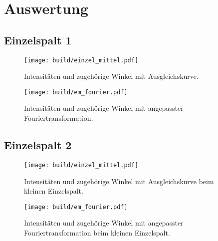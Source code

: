 \section{Auswertung}
\label{sec:Auswertung}
\subsection{Einzelspalt 1}
    \begin{figure}
        \centering
        \texttt{[image: build/einzel\_mittel.pdf]}
        \caption{Intensitäten und zugehörige Winkel mit Ausgleichskurve.}
        \label{fig:einzel_mittel}
    \end{figure}

    \begin{figure}
        \centering
        \texttt{[image: build/em\_fourier.pdf]}
        \caption{Intensitäten und zugehörige Winkel mit angepasster Fouriertransformation.}
        \label{fig:em_fourier}
    \end{figure}


\subsection{Einzelspalt 2}
    \begin{figure}
        \centering
        \texttt{[image: build/einzel\_mittel.pdf]}
        \caption{Intensitäten und zugehörige Winkel mit Ausgleichskurve beim kleinen Einzelspalt.}
        \label{fig:einzel_klein}
    \end{figure}

    \begin{figure}
        \centering
        \texttt{[image: build/em\_fourier.pdf]}
        \caption{Intensitäten und zugehörige Winkel mit angepasster Fouriertransformation beim kleinen Einzelspalt.}
        \label{fig:ek_fourier}
    \end{figure}
